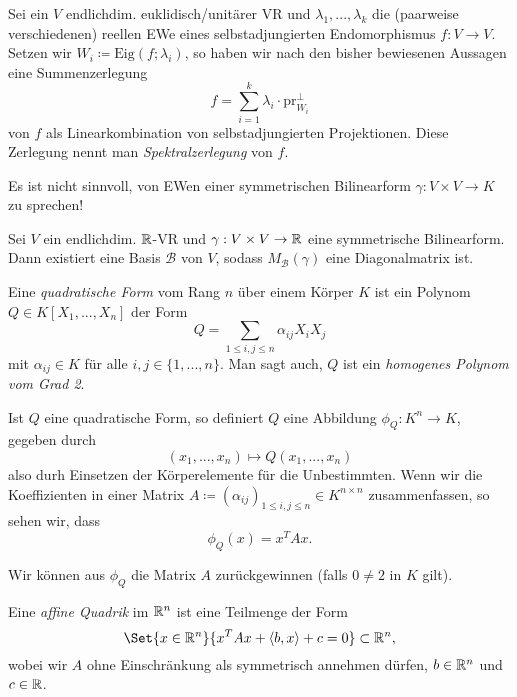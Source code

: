 \documentclass{cheat-sheet}
\newcommand{\Eig}{\mathrm{Eig}}
\newcommand{\BB}{\mathcal{B}}
\begin{document}

\begin{defn}
Sei ein $V$ endlichdim. euklidisch/unitärer VR und $\lambda_1, ..., \lambda_k$ die (paarweise verschiedenen) reellen EWe eines selbstadjungierten Endomorphismus $f : V \to V$. Setzen wir $W_i \coloneqq \Eig(f; \lambda_i)$, so haben wir nach den bisher bewiesenen Aussagen eine Summenzerlegung
\[ f = \sum_{i=1}^k \lambda_i \cdot \mathrm{pr}_{W_i}^{\perp} \]
von $f$ als Linearkombination von selbstadjungierten Projektionen. Diese Zerlegung nennt man \emph{Spektralzerlegung} von $f$.
\end{defn}

\begin{bem}
Es ist nicht sinnvoll, von EWen einer symmetrischen Bilinearform $\gamma : V \times V \to K$ zu sprechen!
\end{bem}

\begin{satz}
Sei $V$ ein endlichdim. $\mathbb{R}$-VR und $\gamma : V \times V \to \mathbb{R}$ eine symmetrische Bilinearform. Dann existiert eine Basis $\BB$ von $V$, sodass $M_{\BB}(\gamma)$ eine Diagonalmatrix ist.
\end{satz}

\begin{defn}
Eine \emph{quadratische Form} vom Rang $n$ über einem Körper $K$ ist ein Polynom $Q \in K[X_1, ..., X_n]$ der Form
\[ Q = \sum_{1 \le i,j \le n} \alpha_{ij} X_i X_j \]
mit $\alpha_{ij} \in K$ für alle $i, j \in \{ 1, ..., n \}$. Man sagt auch, $Q$ ist ein \emph{homogenes Polynom vom Grad 2}.
\end{defn}

\begin{bem}
Ist $Q$ eine quadratische Form, so definiert $Q$ eine Abbildung $\phi_Q : K^n \to K$, gegeben durch
\[ (x_1, ..., x_n) \mapsto Q(x_1, ..., x_n) \]
also durh Einsetzen der Körperelemente für die Unbestimmten. Wenn wir die Koeffizienten in einer Matrix $A \coloneqq (\alpha_{ij})_{1 \le i, j \le n} \in K^{n \times n}$ zusammenfassen, so sehen wir, dass
\[ \phi_Q(x) = x^T A x. \]
\end{bem}

\begin{satz}
Wir können aus $\phi_Q$ die Matrix $A$ zurückgewinnen (falls $0 \not= 2$ in $K$ gilt).
\end{satz}


\begin{defn}
Eine \emph{affine Quadrik} im $\mathbb{R}^n$ ist eine Teilmenge der Form
\[ \Set{ x \in \R^n }{ x^TAx + \langle b , x \rangle + c = 0 } \subset \R^n, \]
wobei wir $A$ ohne Einschränkung als symmetrisch annehmen dürfen, $b \in \mathbb{R}^n$ und $c \in \mathbb{R}$.
\end{defn}
\end{document}
